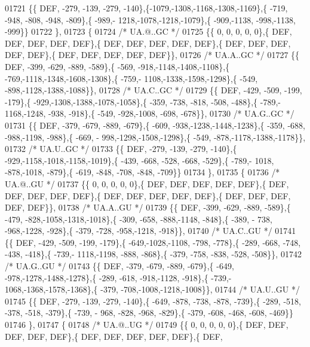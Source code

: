 \begin{DoxyCode}
01721 \{\{  DEF, -279, -139, -279, -140\},\{-1079,-1308,-1168,-1308,-1169\},\{ -719, -948, -808, -948, -809\},\{ -989,-
      1218,-1078,-1218,-1079\},\{ -909,-1138, -998,-1138, -999\}\}
01722 \},
01723 \{
01724 \textcolor{comment}{/* UA.@..GC */}
01725 \{\{    0,    0,    0,    0,    0\},\{  DEF,  DEF,  DEF,  DEF,  DEF\},\{  DEF,  DEF,  DEF,  DEF,  DEF\},\{  DEF,  
      DEF,  DEF,  DEF,  DEF\},\{  DEF,  DEF,  DEF,  DEF,  DEF\}\},
01726 \textcolor{comment}{/* UA.A..GC */}
01727 \{\{  DEF, -399, -629, -889, -589\},\{ -569, -918,-1148,-1408,-1108\},\{ -769,-1118,-1348,-1608,-1308\},\{ -759,-
      1108,-1338,-1598,-1298\},\{ -549, -898,-1128,-1388,-1088\}\},
01728 \textcolor{comment}{/* UA.C..GC */}
01729 \{\{  DEF, -429, -509, -199, -179\},\{ -929,-1308,-1388,-1078,-1058\},\{ -359, -738, -818, -508, -488\},\{ -789,-
      1168,-1248, -938, -918\},\{ -549, -928,-1008, -698, -678\}\},
01730 \textcolor{comment}{/* UA.G..GC */}
01731 \{\{  DEF, -379, -679, -889, -679\},\{ -609, -938,-1238,-1448,-1238\},\{ -359, -688, -988,-1198, -988\},\{ -669, -
      998,-1298,-1508,-1298\},\{ -549, -878,-1178,-1388,-1178\}\},
01732 \textcolor{comment}{/* UA.U..GC */}
01733 \{\{  DEF, -279, -139, -279, -140\},\{ -929,-1158,-1018,-1158,-1019\},\{ -439, -668, -528, -668, -529\},\{ -789,-
      1018, -878,-1018, -879\},\{ -619, -848, -708, -848, -709\}\}
01734 \},
01735 \{
01736 \textcolor{comment}{/* UA.@..GU */}
01737 \{\{    0,    0,    0,    0,    0\},\{  DEF,  DEF,  DEF,  DEF,  DEF\},\{  DEF,  DEF,  DEF,  DEF,  DEF\},\{  DEF,  
      DEF,  DEF,  DEF,  DEF\},\{  DEF,  DEF,  DEF,  DEF,  DEF\}\},
01738 \textcolor{comment}{/* UA.A..GU */}
01739 \{\{  DEF, -399, -629, -889, -589\},\{ -479, -828,-1058,-1318,-1018\},\{ -309, -658, -888,-1148, -848\},\{ -389, -
      738, -968,-1228, -928\},\{ -379, -728, -958,-1218, -918\}\},
01740 \textcolor{comment}{/* UA.C..GU */}
01741 \{\{  DEF, -429, -509, -199, -179\},\{ -649,-1028,-1108, -798, -778\},\{ -289, -668, -748, -438, -418\},\{ -739,-
      1118,-1198, -888, -868\},\{ -379, -758, -838, -528, -508\}\},
01742 \textcolor{comment}{/* UA.G..GU */}
01743 \{\{  DEF, -379, -679, -889, -679\},\{ -649, -978,-1278,-1488,-1278\},\{ -289, -618, -918,-1128, -918\},\{ -739,-
      1068,-1368,-1578,-1368\},\{ -379, -708,-1008,-1218,-1008\}\},
01744 \textcolor{comment}{/* UA.U..GU */}
01745 \{\{  DEF, -279, -139, -279, -140\},\{ -649, -878, -738, -878, -739\},\{ -289, -518, -378, -518, -379\},\{ -739, -
      968, -828, -968, -829\},\{ -379, -608, -468, -608, -469\}\}
01746 \},
01747 \{
01748 \textcolor{comment}{/* UA.@..UG */}
01749 \{\{    0,    0,    0,    0,    0\},\{  DEF,  DEF,  DEF,  DEF,  DEF\},\{  DEF,  DEF,  DEF,  DEF,  DEF\},\{  DEF,  

\end{DoxyCode}
